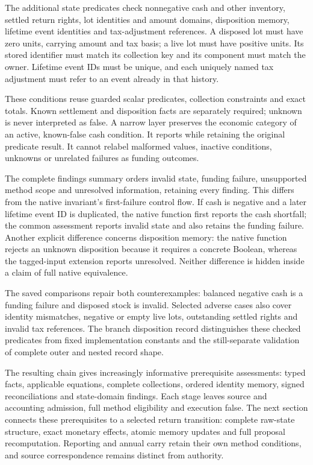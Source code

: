 The additional state predicates check nonnegative cash and other inventory,
settled return rights, lot identities and amount domains, disposition memory,
lifetime event identities and tax-adjustment references. A disposed lot must
have zero units, carrying amount and tax basis; a live lot must have positive
units. Its stored identifier must match its collection key and its component
must match the owner. Lifetime event IDs must be unique, and each uniquely named
tax adjustment must refer to an event already in that history.

These conditions reuse guarded scalar predicates, collection constraints and
exact totals. Known settlement and disposition facts are separately required;
unknown is never interpreted as false. A narrow
 layer preserves the economic category of an active,
known-false cash condition. It reports  while retaining the
original predicate result. It cannot relabel malformed values, inactive
conditions, unknowns or unrelated failures as funding outcomes.

The complete findings summary orders invalid state, funding failure, unsupported
method scope and unresolved information, retaining every finding. This differs
from the native invariant's first-failure control flow. If cash is negative and
a later lifetime event ID is duplicated, the native function first reports the
cash shortfall; the common assessment reports invalid state and also retains
the funding failure. Another explicit difference concerns disposition memory:
the native function rejects an unknown disposition because it requires a
concrete Boolean, whereas the tagged-input extension reports unresolved. Neither
difference is hidden inside a claim of full native equivalence.

The saved comparisons repair both counterexamples: balanced negative cash is a
funding failure and disposed stock is invalid. Selected adverse cases also cover
identity mismatches, negative or empty live lots, outstanding settled rights and
invalid tax references. The branch disposition record distinguishes these
checked predicates from fixed implementation constants and the still-separate
validation of complete outer and nested record shape.

The resulting chain gives increasingly informative prerequisite assessments:
typed facts, applicable equations, complete collections, ordered identity memory,
signed reconciliations and state-domain findings. Each stage leaves source and
accounting admission, full method eligibility and execution false. The next section connects these prerequisites to a selected return transition:
complete raw-state structure, exact monetary effects, atomic memory updates and
full proposal recomputation. Reporting and annual carry retain their own method
conditions, and source correspondence remains distinct from authority.
